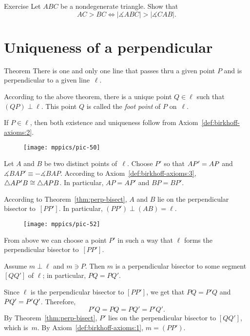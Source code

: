 \begin{thm}{Exercise}\label{ex:side-angle}
Let $ABC$ be a nondegenerate triangle.
Show that 
\[AC>BC\iff|\measuredangle ABC|>|\measuredangle CAB|.\] 
\end{thm}



\section*{Uniqueness of a perpendicular}

\begin{thm}[\abs]{Theorem}\label{perp:ex+un}
There is one and only one line that passes thru a given point $P$ and is perpendicular to a given line~$\ell$.
\end{thm}

According to the above theorem, 
there is a unique point $Q\in\ell$ such that $(QP)\perp\ell$.
This point $Q$ is called the \emph{foot point} of $P$ on~$\ell$. 

If $P\in\ell$, then both existence and uniqueness follow from Axiom~\ref{def:birkhoff-axioms:2}.

{

\begin{wrapfigure}{o}{30mm}
\vskip-4mm
\centering
\texttt{[image: mppics/pic-50]}
\end{wrapfigure}

Let $A$ and $B$ be two distinct points of~$\ell$. 
Choose $P'$ so that $AP'\z=AP$ and $\measuredangle  BAP' \equiv -\measuredangle   BAP$.
According to Axiom~\ref{def:birkhoff-axioms:3}, $\triangle A P' B\z\cong\triangle A P B$.
In particular, $A P= A P'$ and $B P= B P'$.

According to Theorem~\ref{thm:perp-bisect}, $A$ and $B$ lie on the perpendicular bisector to~$[P P']$.
In particular, $(P P')\perp (A B)=\ell$.

}

{

\begin{wrapfigure}{r}{44mm}
\centering
\texttt{[image: mppics/pic-52]}
\end{wrapfigure}

From above we can choose a point $P'$ in such a way that $\ell$ forms the perpendicular bisector to~$[PP']$.

Assume $m\perp \ell$ and $m\ni P$.
Then $m$ is a perpendicular bisector to some segment $[Q Q']$ of $\ell$;
in particular, $P Q= P Q'$.

Since $\ell$ is the perpendicular bisector to $[P P']$,
we get that $PQ= P'Q$ and $PQ' \z= P'Q'$.
Therefore, 
$$P' Q=P Q=P Q'= P' Q'.$$
By Theorem~\ref{thm:perp-bisect}, 
$P'$ lies on the perpendicular bisector to $[QQ']$, which is~$m$.
By Axiom~\ref{def:birkhoff-axioms:1}, $m=(P P')$.
\qeds

}

